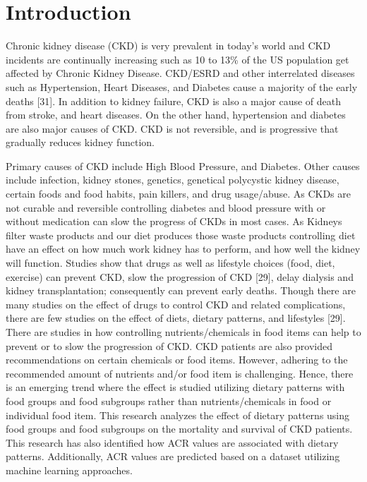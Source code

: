 \section{Introduction}
Chronic kidney disease (CKD) is very prevalent in today’s world and CKD incidents are continually increasing such as 10 to 13\% of the US population get affected by Chronic Kidney Disease. CKD/ESRD and other interrelated diseases such as Hypertension, Heart Diseases, and Diabetes cause a majority of the early deaths [31]. In addition to kidney failure, CKD is also a major cause of death from stroke, and heart diseases. On the other hand, hypertension and diabetes are also major causes of CKD. CKD is not reversible, and is progressive that gradually reduces kidney function. 

\medskip

\noindent Primary causes of CKD include High Blood Pressure, and Diabetes. Other causes include infection, kidney stones, genetics, genetical polycystic kidney disease, certain foods and food habits, pain killers, and drug usage/abuse. As CKDs are not curable and reversible controlling diabetes and blood pressure with or without medication can slow the progress of CKDs in most cases. As Kidneys filter waste products and our diet produces those waste products controlling diet have an effect on how much work kidney has to perform, and how well the kidney will function. Studies show that drugs as well as lifestyle choices (food, diet, exercise) can prevent CKD, slow the progression of CKD [29], delay dialysis and kidney transplantation; consequently can prevent early deaths. Though there are many studies on the effect of drugs to control CKD and related complications, there are few studies on the effect of diets, dietary patterns, and lifestyles [29]. There  are studies in how controlling nutrients/chemicals in food items can help to prevent or to slow the progression of CKD. CKD patients are also provided recommendations on certain chemicals or food items. However, adhering to the recommended amount of nutrients and/or food item is challenging. Hence, there is an emerging trend where the effect is studied utilizing  dietary patterns with food groups and food subgroups rather than nutrients/chemicals in food or individual food item. This research analyzes the effect of dietary patterns using food groups and food subgroups on  the mortality and survival of CKD patients. This research has also identified how ACR values are associated with dietary patterns. Additionally, ACR values are predicted based on a dataset utilizing machine learning approaches.

